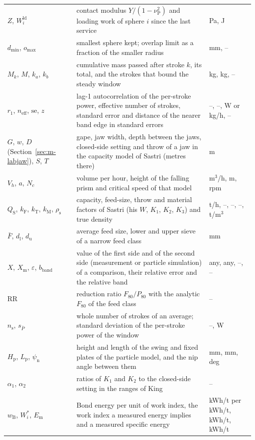 \begin{longtable}{@{}p{} p{} p{}@{}}
$Z$, $W^{\mathrm{ld}}_i$ & contact modulus $Y/(1-\nu_{\mathrm P}^2)$ and loading work of sphere $i$ since the last service & Pa, J \\
$d_{\min}$, $o_{\max}$ & smallest sphere kept; overlap limit as a fraction of the smaller radius & mm, -- \\
$M_k$, $M$, $k_a$, $k_b$ & cumulative mass passed after stroke $k$, its total, and the strokes that bound the steady window & kg, kg, -- \\
$r_1$, $n_{\mathrm{eff}}$, $\mathrm{se}$, $z$ & lag-1 autocorrelation of the per-stroke power, effective number of strokes, standard error and distance of the nearer band edge in standard errors & --, --, W or kg/h, -- \\
$G$, $w$, $D$ (Section~\ref{sec:m-labjaw}), $S$, $T$ & gape, jaw width, depth between the jaws, closed-side setting and throw of a jaw in the capacity model of Sastri (metres there) & m \\
$V_h$, $a$, $N_c$ & volume per hour, height of the falling prism and critical speed of that model & m$^3$/h, m, rpm \\
$Q_{\mathrm S}$, $k_{\mathrm F}$, $k_{\mathrm T}$, $k_{\mathrm M}$, $\rho_{\mathrm s}$ & capacity, feed-size, throw and material factors of Sastri (his $W$, $K_1$, $K_2$, $K_3$) and true density & t/h, --, --, --, t/m$^3$ \\
$\bar F$, $d_{\mathrm l}$, $d_{\mathrm u}$ & average feed size, lower and upper sieve of a narrow feed class & mm \\
$X$, $X_{\mathrm m}$, $\varepsilon$, $b_{\mathrm{band}}$ & value of the first side and of the second side (measurement or particle simulation) of a comparison, their relative error and the relative band & any, any, --, -- \\
$\mathrm{RR}$ & reduction ratio $F_{80}/P_{80}$ with the analytic $F_{80}$ of the feed class & -- \\
$n_{\mathrm s}$, $s_{\bar P}$ & whole number of strokes of an average; standard deviation of the per-stroke power of the window & --, W \\
$H_{\mathrm p}$, $L_{\mathrm p}$, $\psi_{\mathrm n}$ & height and length of the swing and fixed plates of the particle model, and the nip angle between them & mm, mm, deg \\
$\alpha_1$, $\alpha_2$ & ratios of $K_1$ and $K_2$ to the closed-side setting in the ranges of King & -- \\
$w_{\mathrm B}$, $W_i^{\ast}$, $E_{\mathrm m}$ & Bond energy per unit of work index, the work index a measured energy implies and a measured specific energy & kWh/t per kWh/t, kWh/t, kWh/t \\
\end{longtable}
\endgroup
